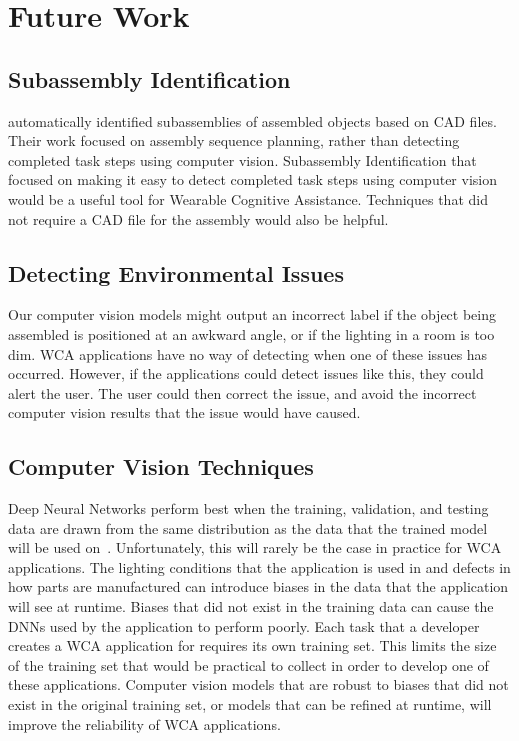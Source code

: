 \section{Future Work}

\subsection{Subassembly Identification}

\citet{subassembly_identification} automatically identified subassemblies of
assembled objects based on CAD files.
Their work focused on assembly sequence
planning, rather than detecting completed task steps using computer vision.
Subassembly Identification that focused on making it easy to detect completed
task steps using computer vision would be a useful tool for Wearable Cognitive
Assistance.
Techniques that did not require a CAD file for the assembly would also be
helpful.

\subsection{Detecting Environmental Issues}

Our computer vision models might output an incorrect label if the object being
assembled is positioned at an awkward angle, or if the lighting in a room is
too dim.
WCA applications have no way of detecting when one of these issues has
occurred.
However, if the applications could detect issues like this, they could alert the
user.
The user could then correct the issue, and avoid the incorrect computer vision
results that the issue would have caused.

\subsection{Computer Vision Techniques}

Deep Neural Networks perform best when the training, validation, and testing
data are drawn from the same distribution as the data that the trained model
will be used on~\cite{pmlr-v97-recht19a}.
Unfortunately, this will rarely be the case in practice for WCA applications.
The lighting conditions that the application is used in and defects in how parts
are manufactured can introduce biases in the data that the application will see
at runtime.
Biases that did not exist in the training data can cause the DNNs used by the
application to perform poorly.
Each task that a developer creates a WCA application for requires its own
training set.
This limits the size of the training set that would be practical to collect in
order to develop one of these applications.
Computer vision models that are robust to biases that did not exist in the
original training set, or models that can be refined at runtime, will improve
the reliability of WCA applications.

